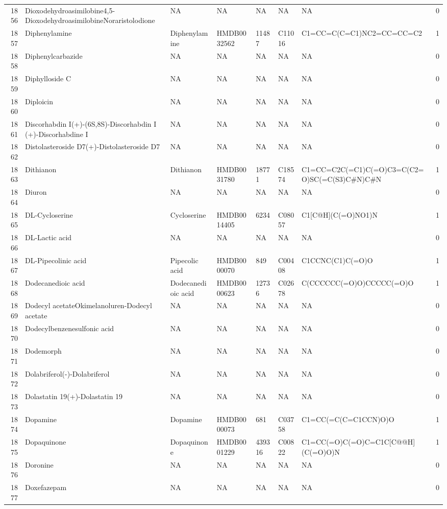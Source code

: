 \documentclass[a4paper]{article}
\begin{document}
\begin{longtable}{rlllllll}
  1856 & Dioxodehydroasimilobine4,5-DioxodehydroasimilobineNoraristolodione & NA & NA & NA & NA & NA & 0 \\ 
  1857 & Diphenylamine & Diphenylamine & HMDB0032562 & 11487 & C11016 & C1=CC=C(C=C1)NC2=CC=CC=C2 & 1 \\ 
  1858 & Diphenylcarbazide & NA & NA & NA & NA & NA & 0 \\ 
  1859 & Diphylloside C & NA & NA & NA & NA & NA & 0 \\ 
  1860 & Diploicin & NA & NA & NA & NA & NA & 0 \\ 
  1861 & Discorhabdin I(+)-(6S,8S)-Discorhabdin I (+)-Discorhabdine I & NA & NA & NA & NA & NA & 0 \\ 
  1862 & Distolasteroside D7(+)-Distolasteroside D7 & NA & NA & NA & NA & NA & 0 \\ 
  1863 & Dithianon & Dithianon & HMDB0031780 & 18771 & C18574 & C1=CC=C2C(=C1)C(=O)C3=C(C2=O)SC(=C(S3)C\#N)C\#N & 1 \\ 
  1864 & Diuron & NA & NA & NA & NA & NA & 0 \\ 
  1865 & DL-Cycloserine & Cycloserine & HMDB0014405 & 6234 & C08057 & C1[C@H](C(=O)NO1)N & 1 \\ 
  1866 & DL-Lactic acid & NA & NA & NA & NA & NA & 0 \\ 
  1867 & DL-Pipecolinic acid & Pipecolic acid & HMDB0000070 & 849 & C00408 & C1CCNC(C1)C(=O)O & 1 \\ 
  1868 & Dodecanedioic acid & Dodecanedioic acid & HMDB0000623 & 12736 & C02678 & C(CCCCCC(=O)O)CCCCC(=O)O & 1 \\ 
  1869 & Dodecyl acetateOkimelanoluren-Dodecyl acetate & NA & NA & NA & NA & NA & 0 \\ 
  1870 & Dodecylbenzenesulfonic acid & NA & NA & NA & NA & NA & 0 \\ 
  1871 & Dodemorph & NA & NA & NA & NA & NA & 0 \\ 
  1872 & Dolabriferol(-)-Dolabriferol & NA & NA & NA & NA & NA & 0 \\ 
  1873 & Dolastatin 19(+)-Dolastatin 19 & NA & NA & NA & NA & NA & 0 \\ 
  1874 & Dopamine & Dopamine & HMDB0000073 & 681 & C03758 & C1=CC(=C(C=C1CCN)O)O & 1 \\ 
  1875 & Dopaquinone & Dopaquinone & HMDB0001229 & 439316 & C00822 & C1=CC(=O)C(=O)C=C1C[C@@H](C(=O)O)N & 1 \\ 
  1876 & Doronine & NA & NA & NA & NA & NA & 0 \\ 
  1877 & Doxefazepam & NA & NA & NA & NA & NA & 0 \\ 

\end{longtable}
\end{document}
